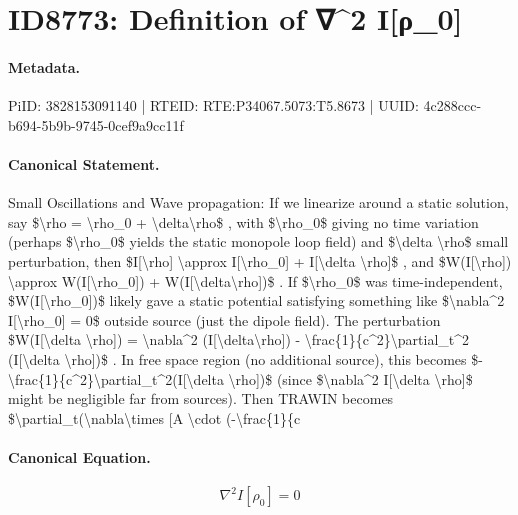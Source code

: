 \section*{ID8773: Definition of ∇\textasciicircum{}2 I[ρ\_0]}
\paragraph{Metadata.}
PiID: 3828153091140 | RTEID: RTE:P34067.5073:T5.8673 | UUID: 4c288ccc-b694-5b9b-9745-0cef9a9cc11f

\paragraph{Canonical Statement.}
Small Oscillations and Wave propagation: If we linearize around a static solution, say \$\textbackslash{}rho = \textbackslash{}rho\_0 + \textbackslash{}delta\textbackslash{}rho\$ , with \$\textbackslash{}rho\_0\$ giving no time variation (perhaps \$\textbackslash{}rho\_0\$ yields the static monopole loop field) and \$\textbackslash{}delta \textbackslash{}rho\$ small perturbation, then \$I[\textbackslash{}rho] \textbackslash{}approx I[\textbackslash{}rho\_0] + I[\textbackslash{}delta \textbackslash{}rho]\$ , and \$W(I[\textbackslash{}rho]) \textbackslash{}approx W(I[\textbackslash{}rho\_0]) + W(I[\textbackslash{}delta\textbackslash{}rho])\$ . If \$\textbackslash{}rho\_0\$ was time-independent, \$W(I[\textbackslash{}rho\_0])\$ likely gave a static potential satisfying something like \$\textbackslash{}nabla\textasciicircum{}2 I[\textbackslash{}rho\_0] = 0\$ outside source (just the dipole field). The perturbation \$W(I[\textbackslash{}delta \textbackslash{}rho]) = \textbackslash{}nabla\textasciicircum{}2 (I[\textbackslash{}delta\textbackslash{}rho]) - \textbackslash{}frac\{1\}\{c\textasciicircum{}2\}\textbackslash{}partial\_t\textasciicircum{}2 (I[\textbackslash{}delta \textbackslash{}rho])\$ . In free space region (no additional source), this becomes \$-\textbackslash{}frac\{1\}\{c\textasciicircum{}2\}\textbackslash{}partial\_t\textasciicircum{}2(I[\textbackslash{}delta \textbackslash{}rho])\$ (since \$\textbackslash{}nabla\textasciicircum{}2 I[\textbackslash{}delta \textbackslash{}rho]\$ might be negligible far from sources). Then TRAWIN becomes \$\textbackslash{}partial\_t(\textbackslash{}nabla\textbackslash{}times [A \textbackslash{}cdot (-\textbackslash{}frac\{1\}\{c

\paragraph{Canonical Equation.}
\[
\nabla^2 I[\rho_0] = 0
\]

